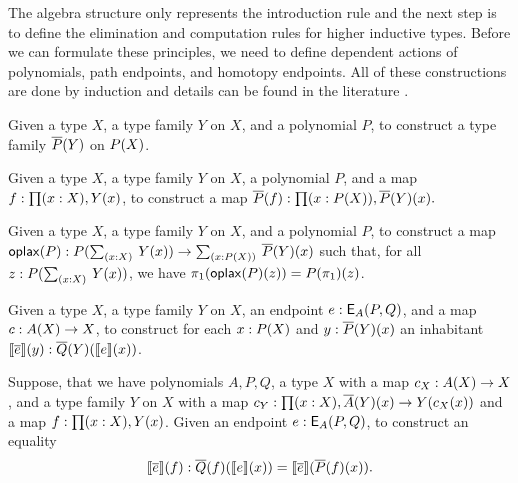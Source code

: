 The algebra structure only represents the introduction rule
and the next step is to define the elimination and computation rules for higher inductive types.
Before we can formulate these principles, we need to define dependent actions of polynomials, path endpoints, and homotopy endpoints.
All of these constructions are done by induction and details can be found in the literature \cite{DBLP:journals/entcs/DybjerM18,hermida1998structural,van2019construction}.

\begin{problem}
\label{prob:poly_dact}
Given a type $X$, a type family $Y$ on $X$, and a polynomial $P$,
to construct a type family $\overline{P}(Y)$ on $P(X)$.
\end{problem}

\begin{problem}
\label{prob:poly_dmap}
Given a type $X$, a type family $Y$ on $X$, a polynomial $P$, and a map $f : \prod (x : X) , Y(x)$,
to construct a map
$
\overline{P}(f) : \prod (x : P(X)) , \overline{P}(Y)(x).
$
\end{problem}

\begin{problem}
\label{prob:poly_pr}
Given a type $X$, a type family $Y$ on $X$, and a polynomial $P$, to construct a map
$
\polyoplax P : \polyAct{P}{\Sum (x : X). Y(x)} \rightarrow \Sum (x : \polyAct{P}{X}). \polyDact{P}{Y}(x)
$
such that, for all $z :  \polyAct{P}{\Sum (x : X). Y(x)}$, we have $\pi_1(\mathsf{oplax}(P)(z)) = P(\pi_1)(z)$.
\end{problem}

\begin{problem}
\label{prob:endpoint_dact}
Given a type $X$, a type family $Y$ on $X$, an endpoint $e : \mathsf{E}_{A}(P,Q)$, and a map $c : A(X) \rightarrow X$,
to construct for each $x : P(X)$ and $y : \overline{P}(Y)(x)$ an inhabitant $\llbracket \overline{e} \rrbracket(y) : \overline{Q}(Y)(\llbracket e \rrbracket(x))$.
\end{problem}

\begin{problem}
\label{prob:endpoint_dact_natural}
Suppose, that we have polynomials $A, P, Q$, a type $X$ with a map $c_X : A(X) \rightarrow X$,
and a type family $Y$ on $X$ with a map $c_Y : \prod (x : X) , \overline{A}(Y)(x) \rightarrow Y(c_X(x))$
and a map $f : \prod (x : X) , Y(x)$.
Given an endpoint $e : \mathsf{E}_{A}(P,Q)$,
to construct an equality
\[
\llbracket \overline{e} \rrbracket(f) : \overline{Q}(f)(\llbracket e \rrbracket(x)) = \llbracket \overline{e} \rrbracket(\overline{P}(f)(x)).
\]
\end{problem}

